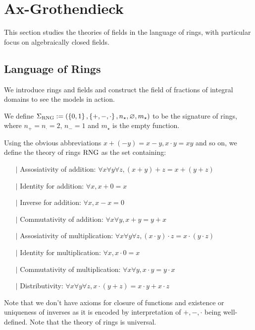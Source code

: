 \section{Ax-Grothendieck}
This section studies the theories of fields in the language of rings,
with particular focus on algebraically closed fields.
\subsection{Language of Rings}
We introduce rings and fields and construct the field of fractions
of integral domains to see the models in action.

\begin{dfn}
    We define 
    $\Sigma_{\mathrm{RNG}} := (\left\{0,1\right\},\left\{+,-,\cdot\right\},n_\star,\varnothing,m_\star)$ 
    to be the signature of rings, 
    where
    $n_+ = n_\cdot = 2$, $n_- = 1$ and $m_\star$ is the empty function.

    Using the obvious abbreviations
    $x + (-y) = x - y, x \cdot y = xy$ and so on,
    we define the theory of rings $\mathrm{RNG}$ as the set containing:
    \begin{itemize}
        \item[$\vert$] Assosiativity of addition: 
            $\forall x \forall y \forall z, (x + y) + z = x + (y + z)$
        \item[$\vert$] Identity for addition:
            $\forall x, x + 0 = x$ 
        \item[$\vert$] Inverse for addition: $\forall x, x - x = 0$ 
        \item[$\vert$] Commutativity of addition: 
            $\forall x \forall y, x + y = y + x$
        \item[$\vert$] Assosiativity of multiplication: 
        $\forall x \forall y \forall z, 
        (x \cdot y) \cdot z = x \cdot (y \cdot z)$
        \item[$\vert$] Identity for multiplication:
        $\forall x, x \cdot 0 = x$ 
        \item[$\vert$] Commutativity of multiplication: 
        $\forall x \forall y, x \cdot y = y \cdot x$
        \item[$\vert$] Distributivity:
        $\forall x \forall y \forall z, x \cdot (y + z) = x\cdot y + x \cdot z$
    \end{itemize}
    Note that we don't have axioms for closure of functions 
    and existence or uniqueness of inverses as
    it is encoded by interpretation of 
    $+, -, \cdot$ being well-defined.
    Note that the theory of rings is universal.
\end{dfn}

